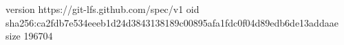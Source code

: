 version https://git-lfs.github.com/spec/v1
oid sha256:ca2fdb7e534eeeb1d24d3843138189c00895afa1fdc0f04d89edb6de13addaae
size 196704

